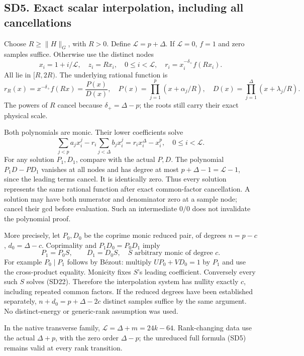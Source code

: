 \documentclass[11pt]{article}
\begin{document}
\subsection{SD5. Exact scalar interpolation, including all cancellations}\label{sd5.-exact-scalar-interpolation-including-all-cancellations}

Choose \(R\ge\|H\|_G\), with \(R>0\). Define \(\mathcal L=p+\Delta\). If \(\mathcal L=0\), \(f=1\) and zero samples suffice. Otherwise use the distinct nodes \[
x_i=1+i/\mathcal L,\quad z_i=Rx_i,\quad0\le i<\mathcal L,
\quad r_i=x_i^{-\delta_+}f(Rx_i).
\tag{SD20}
\] All lie in \([R,2R)\). The underlying rational function is \[
r_R(x)=x^{-\delta_+}f(Rx)
=\frac{P(x)}{D(x)},\quad
P(x)=\prod_{j=1}^p(x+\alpha_j/R),\quad
D(x)=\prod_{j=1}^{\Delta}(x+\lambda_j/R).
\tag{SD21}
\] The powers of \(R\) cancel because \(\delta_+=\Delta-p\); the roots still carry their exact physical scale.

Both polynomials are monic. Their lower coefficients solve \[
\sum_{j<p}a_jx_i^j-r_i\sum_{j<\Delta}b_jx_i^j
=r_ix_i^\Delta-x_i^p,\quad0\le i<\mathcal L.
\tag{SD22}
\] For any solution \(P_1,D_1\), compare with the actual \(P,D\). The polynomial \(P_1D-PD_1\) vanishes at all nodes and has degree at most \(p+\Delta-1=\mathcal L-1\), since the leading terms cancel. It is identically zero. Thus every solution represents the same rational function after exact common-factor cancellation. A solution may have both numerator and denominator zero at a sample node; cancel their gcd before evaluation. Such an intermediate \(0/0\) does not invalidate the polynomial proof.

More precisely, let \(P_0,D_0\) be the coprime monic reduced pair, of degrees \(n=p-c\), \(d_0=\Delta-c\). Coprimality and \(P_1D_0=P_0D_1\) imply \[
P_1=P_0S,\qquad D_1=D_0S,
\quad S\text{ arbitrary monic of degree }c.
\tag{SD23}
\] For example \(P_0\mid P_1\) follows by Bézout: multiply \(UP_0+VD_0=1\) by \(P_1\) and use the cross-product equality. Monicity fixes \(S\)'s leading coefficient. Conversely every such \(S\) solves (SD22). Therefore the interpolation system has nullity exactly \(c\), including repeated common factors. If the reduced degrees have been established separately, \(n+d_0=p+\Delta-2c\) distinct samples suffice by the same argument. No distinct-energy or generic-rank assumption was used.

In the native transverse family, \(\mathcal L=\Delta+m=24k-64\). Rank-changing data use the actual \(\Delta+p\), with the zero order \(\Delta-p\); the unreduced full formula (SD5) remains valid at every rank transition.
\end{document}
